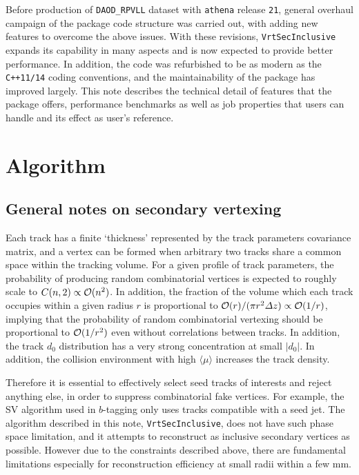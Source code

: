 \documentclass[NOTE, atlasdraft=true, texlive=2018, UKenglish]{\ATLASLATEXPATH atlasdoc}
\begin{document}
Before production of {\tt DAOD\_RPVLL} dataset with {\tt athena} release {\tt 21}, general overhaul campaign of the package code structure was carried out, with adding new features to overcome the above issues. With these revisions, {\tt VrtSecInclusive} expands its capability in many aspects and is now expected to provide better performance. In addition, the code was refurbished to be as modern as the {\tt C++11/14} coding conventions, and the maintainability of the package has improved largely. This note describes the technical detail of features that the package offers, performance benchmarks as well as job properties that users can handle and its effect as user's reference.

\section{Algorithm}
\label{sec:structure}

\subsection{General notes on secondary vertexing}
Each track has a finite `thickness' represented by the track parameters covariance matrix, and a vertex can be formed when arbitrary two tracks share a common space within the tracking volume. For a given profile of track parameters, the probability of producing random combinatorial vertices is expected to roughly scale to $C(n,2)\propto {\cal O}(n^{2})$. In addition, the fraction of the volume which each track occupies within a given radius $r$ is proportional to ${\cal O}(r)/(\pi r^{2}\varDelta z)\propto {\cal O}(1/r)$, implying that the probability of random combinatorial vertexing should be proportional to ${\cal O}(1/r^{2})$ even without correlations between tracks. In addition, the track $d_{0}$ distribution has a very strong concentration at small $|d_{0}|$. In addition, the collision environment with high $\langle\mu\rangle$ increases the track density.

Therefore it is essential to effectively select seed tracks of interests and reject anything else, in order to suppress combinatorial fake vertices. For example, the SV algorithm used in $b$-tagging only uses tracks compatible with a seed jet. The algorithm described in this note, {\tt VrtSecInclusive}, does not have such phase space limitation, and it attempts to reconstruct as inclusive secondary vertices as possible. However due to the constraints described above, there are fundamental limitations especially for reconstruction efficiency at small radii within a few mm.
\end{document}
